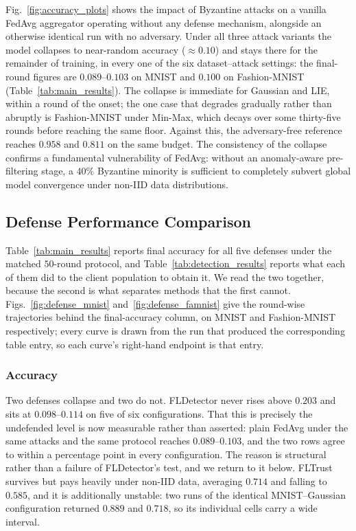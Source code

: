 \documentclass[journal]{IEEEtran}
\begin{document}
Fig.~\ref{fig:accuracy_plots} shows the impact of Byzantine attacks on a vanilla FedAvg aggregator operating without any defense mechanism, alongside an otherwise identical run with no adversary. Under all three attack variants the model collapses to near-random accuracy ($\approx 0.10$) and stays there for the remainder of training, in every one of the six dataset--attack settings: the final-round figures are $0.089$--$0.103$ on MNIST and $0.100$ on Fashion-MNIST (Table~\ref{tab:main_results}). The collapse is immediate for Gaussian and LIE, within a round of the onset; the one case that degrades gradually rather than abruptly is Fashion-MNIST under Min-Max, which decays over some thirty-five rounds before reaching the same floor. Against this, the adversary-free reference reaches $0.958$ and $0.811$ on the same budget. The consistency of the collapse confirms a fundamental vulnerability of FedAvg: without an anomaly-aware pre-filtering stage, a $40\%$ Byzantine minority is sufficient to completely subvert global model convergence under non-IID data distributions.


\subsection{Defense Performance Comparison}
\label{sec:defense_comparison}

Table~\ref{tab:main_results} reports final accuracy for all five defenses under the matched
$50$-round protocol, and Table~\ref{tab:detection_results} reports what each of them did to
the client population to obtain it. We read the two together, because the second is what
separates methods that the first cannot. Figs.~\ref{fig:defense_mnist}
and~\ref{fig:defense_famnist} give the round-wise trajectories behind the final-accuracy
column, on MNIST and Fashion-MNIST respectively; every curve is drawn from the run that
produced the corresponding table entry, so each curve's right-hand endpoint is that entry.

\subsubsection{Accuracy}
Two defenses collapse and two do not. FLDetector never rises above $0.203$ and sits at
$0.098$--$0.114$ on five of six configurations. That this is precisely the undefended level
is now measurable rather than asserted: plain FedAvg under the same attacks and the same
protocol reaches $0.089$--$0.103$, and the two rows agree to within a percentage point in
every configuration. The reason is structural rather than a failure of FLDetector's test,
and we return to it below. FLTrust
survives but pays heavily under non-IID data, averaging $0.714$ and falling to $0.585$, and
it is additionally unstable: two runs of the identical MNIST--Gaussian configuration
returned $0.889$ and $0.718$, so its individual cells carry a wide interval.
\end{document}
